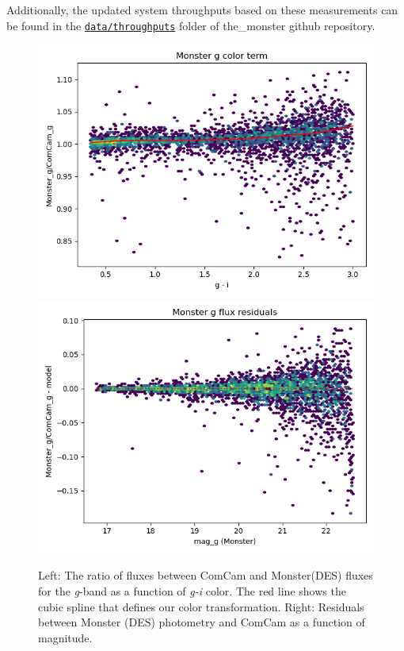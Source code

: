 Additionally, the updated system throughputs based on these measurements can be found in the \href{https://github.com/lsst-dm/the_monster/tree/main/data/throughputs}{\texttt{data/throughputs}} folder of the\_monster github repository.


\begin{figure}
    \includegraphics[width=0.49\linewidth]{./figures/color_terms/Monster_to_ComCam_band_g_color_term.png}
    \includegraphics[width=0.49\linewidth]{./figures/color_terms/Monster_to_ComCam_band_g_flux_residuals.png}
    \caption{Left: The ratio of fluxes between ComCam and Monster(DES) fluxes for the \textit{g}-band as a function of \textit{g-i} color. The red line shows the cubic spline that defines our color transformation.
    Right: Residuals between Monster (DES) photometry and ComCam as a function of magnitude.}
    \label{fig:color-monster-to-comcam-g}
\end{figure}


